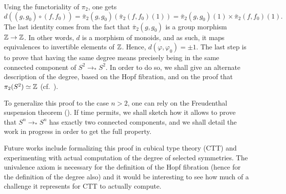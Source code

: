 \documentclass{easychair}
\newcommand{\Sp}{{S^2}}%
\newcommand{\Sn}{{S^n}}%
\newcommand{\ptdto}{\to_\ast}%
\begin{document}
Using the functoriality of $\pi_2$, one gets
\begin{displaymath}
  d((g,g_0)\circ (f,f_0)) = \bar\pi_2(g,g_0)\left( \bar\pi_2(f,f_0)(1)\right)
  = \bar\pi_2(g,g_0)(1)\times\bar\pi_2(f,f_0)(1).
\end{displaymath}
The last identity comes from the fact that $\bar\pi_2(g,g_0)$ is a
group morphism $\mathbb{Z}\to\mathbb{Z}$. In other words, $d$ is a morphism of
monoids, and as such, it maps equivalences to invertible elements of
$\mathbb{Z}$. Hence, $d(\varphi,\varphi_0) = \pm 1$. The last step is to
prove that having the same degree means precisely being in the same
connected component of $\Sp \ptdto \Sp$. In order to do so, we shall
give an alternate description of the degree, based on the Hopf
fibration, and on the proof that $\pi_2(\Sp) \weq \ZZ$ (cf.\
\cite[Ch.~8.6]{HoTT}).

To generalize this proof to the case $n>2$, one can rely on the
Freudenthal suspension theorem (\cite[Ch.~8.6]{HoTT}). If time
permits, we shall sketch how it allows to prove that $\Sn \ptdto \Sn$
has exactly two connected components, and we shall detail the work in
progress in order to get the full property.


Future works include formalizing this proof in cubical type theory
(CTT) and experimenting with actual computation of the degree of
selected symmetries. The univalence axiom is necessary for the
definition of the Hopf fibration (hence for the definition of the
degree also) and it would be interesting to see how much of a
challenge it represents for CTT to actually compute.



\end{document}
